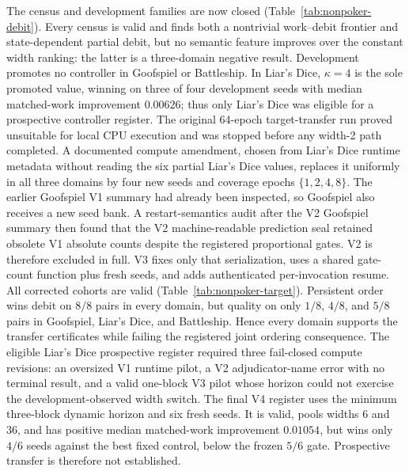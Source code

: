 The census and development families are now closed
(Table~\ref{tab:nonpoker-debit}).  Every census is valid and finds both a
nontrivial work--debit frontier and state-dependent partial debit, but no
semantic feature improves over the constant width ranking: the latter is a
three-domain negative result.  Development promotes no controller in
Goofspiel or Battleship.  In Liar's Dice, $\kappa=4$ is the sole promoted
value, winning on three of four development seeds with median matched-work
improvement $0.00626$; thus only Liar's Dice was eligible for a prospective
controller register.
The original 64-epoch target-transfer run proved unsuitable for local CPU
execution and was stopped before any width-2 path completed.  A documented
compute amendment, chosen from Liar's Dice runtime metadata without reading
the six partial Liar's Dice values, replaces it uniformly in all three domains
by four new seeds and coverage epochs $\{1,2,4,8\}$.  The earlier Goofspiel V1
summary had already been inspected, so Goofspiel also receives a new seed
bank.  A restart-semantics audit after the V2 Goofspiel summary then found that
the V2 machine-readable prediction seal retained obsolete V1 absolute counts
despite the registered proportional gates.  V2 is therefore excluded in full.
V3 fixes only that serialization,
uses a shared gate-count function plus fresh seeds, and adds authenticated
per-invocation resume.  All corrected cohorts are valid
(Table~\ref{tab:nonpoker-target}).  Persistent order wins debit on $8/8$
pairs in every domain, but quality on only $1/8$, $4/8$, and $5/8$ pairs in
Goofspiel, Liar's Dice, and Battleship.  Hence every domain supports the
transfer certificates while failing the registered joint ordering
consequence.  The eligible Liar's Dice prospective register required three
fail-closed compute revisions: an oversized V1 runtime pilot, a V2
adjudicator-name error with no terminal result, and a valid one-block V3 pilot
whose horizon could not exercise the development-observed width switch.  The
final V4 register uses the minimum three-block dynamic horizon and six fresh
seeds.  It is valid, pools widths 6 and 36, and has positive median
matched-work improvement $0.01054$, but wins only $4/6$ seeds against the
best fixed control, below the frozen $5/6$ gate.  Prospective transfer is
therefore not established.


